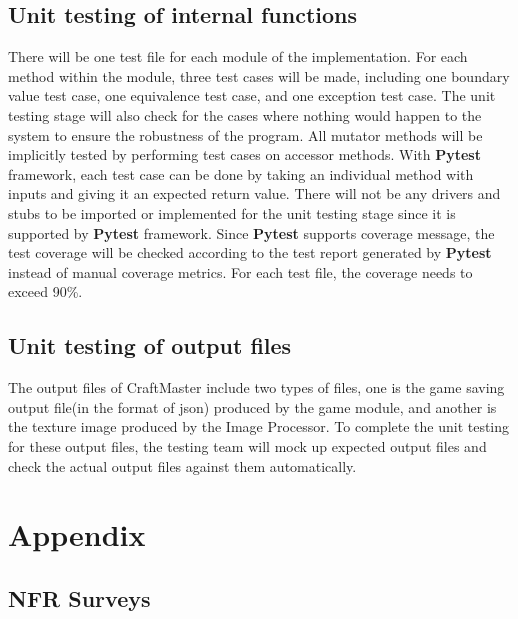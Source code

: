\documentclass[12pt, titlepage]{article}
\begin{document}
\subsection{Unit testing of internal functions}
There will be one test file for each module of the implementation. For each method within the module, three test cases will be made, including one boundary value test case, one equivalence test case, and one exception test case. The unit testing stage will also check for the cases where nothing would happen to the system to ensure the robustness of the program. All mutator methods will be implicitly tested by performing test cases on accessor methods. With \textbf{Pytest} framework, each test case can be done by taking an individual method with inputs and giving it an expected return value. There will not be any drivers and stubs to be imported or implemented for the unit testing stage since it is supported by \textbf{Pytest} framework. Since \textbf{Pytest} supports coverage message, the test coverage will be checked according to the test report generated by \textbf{Pytest} instead of manual coverage metrics. For each test file, the coverage needs to exceed 90\%.
\subsection{Unit testing of output files}
The output files of CraftMaster include two types of files, one is the game saving output file(in the format of json) produced by the game module, and another is the texture image produced by the Image Processor. To complete the unit testing for these output files, the testing team will mock up expected output files and check the actual output files against them automatically.




\newpage

\section{Appendix}

\subsection{NFR Surveys}
\end{document}
